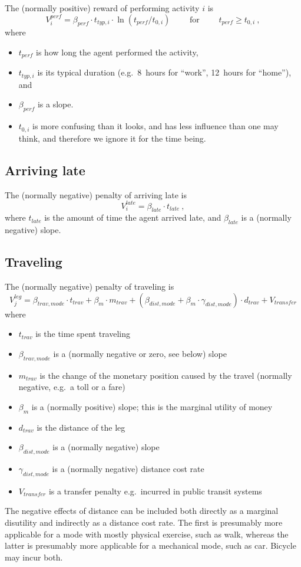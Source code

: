 The (normally positive) reward of performing activity $i$ is
\[
V^{perf}_i = \beta_{perf} \cdot t_{typ,i} \cdot \ln( t_{perf} / t_{0,i} ) 
%
\qquad \mbox{ for } \qquad
%
t_{perf} \ge t_{0,i} \ ,
\]
where
\begin{itemize}

\item
$t_{perf}$ is how long the agent performed the activity, 

\item $t_{typ,i}$ is its typical duration (e.g.\ 8~hours for ``work'', 12~hours for ``home''), and

\item $\beta_{perf}$ is a slope.

\item  $t_{0,i}$ is more confusing than it looks, and has less influence than one may think, and therefore we ignore it for the time being.

\end{itemize}

\subsection{Arriving late}

The (normally negative) penalty of arriving late is
\[
V^{late}_i = \beta_{late} \cdot t_{late} \ ,
\]
where $t_{late}$ is the amount of time the agent arrived late, and $\beta_{late}$ is a (normally negative) slope.

\subsection{Traveling}

The (normally negative) penalty of traveling is
\[
V^{leg}_j = \beta_{trav,mode} \cdot t_{trav} 
%
+ \beta_m \cdot m_{trav}
%
+ (\beta_{dist,mode} + \beta_m \cdot \gamma_{dist,mode}) \cdot d_{trav}
%
+ V_{transfer}
\]
where
\begin{itemize}
\item $t_{trav}$ is the time spent traveling
\item $\beta_{trav,mode}$ is a (normally negative or zero, see below) slope
\item $m_{trav}$ is the change of the monetary position caused by the travel (normally negative, e.g.\ a toll or a fare)
\item $\beta_m$ is a (normally positive) slope; this is the marginal utility of money
\item $d_{trav}$ is the distance of the leg
\item $\beta_{dist,mode}$ is a (normally negative) slope
\item $\gamma_{dist,mode}$ is a (normally negative) distance cost rate
\item $V_{transfer}$ is a transfer penalty e.g.\ incurred in public transit systems
\end{itemize}
The negative effects of distance can be included both directly as a marginal disutility and indirectly as a distance cost rate.  The first is presumably more applicable for a mode with mostly physical exercise, such as walk, whereas the latter is presumably more applicable for a mechanical mode, such as car.  Bicycle may incur both.

